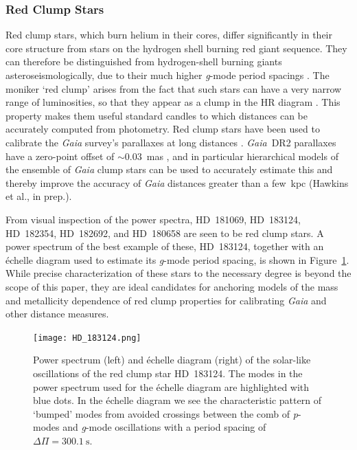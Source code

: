 \documentclass[a4paper,fleqn,usenatbib]{mnras}
\newcommand{\gaia}{\emph{Gaia}\xspace}
\begin{document}
\subsubsection{Red Clump Stars}
\label{clumpstars}

Red clump stars, which burn helium in their cores, differ significantly in their core structure from stars on the hydrogen shell burning red giant sequence. They can therefore be distinguished from hydrogen-shell burning giants asteroseismologically, due to their much higher \emph{g}-mode period spacings \citep{rggmodehelium}. 
The moniker `red clump' arises from the fact that such stars can have a very narrow range of luminosities, so that they appear as a clump in the HR diagram \citep{2016ARA&A..54...95G}. This property makes them useful standard candles to which distances can be accurately computed from photometry. Red clump stars have been used to calibrate the \gaia survey's parallaxes at long distances \citep{2017A&A...598L...4D,2017MNRAS.471..722H,2018A&A...609A.116R}. \gaia~DR2 parallaxes have a zero-point offset of $\sim 0.03$~mas \citep{gaiadr2parallax}, and in particular hierarchical models of the ensemble of \gaia clump stars can be used to accurately estimate this and thereby improve the accuracy of \gaia distances greater than a few~kpc (Hawkins et al., in prep.).

From visual inspection of the power spectra, HD~181069, HD~183124, HD~182354, HD~182692, and HD~180658 are seen to be red clump stars. A power spectrum of the best example of these, HD~183124, together with an \'{e}chelle diagram used to estimate its \emph{g}-mode period spacing, is shown in Figure~\ref{HD_183124}. While precise characterization of these stars to the necessary degree is beyond the scope of this paper, they are ideal candidates for anchoring models of the mass and metallicity dependence of red clump properties for calibrating \gaia and other distance measures. 

\begin{figure}
\noindent\texttt{[image: HD\_183124.png]}

\caption{\label{HD_183124}
Power spectrum (left) and \'{e}chelle diagram (right) of the solar-like oscillations of the red clump star HD~183124. The modes in the power spectrum used for the \'{e}chelle diagram are highlighted with blue dots. In the \'{e}chelle diagram we see the characteristic pattern of `bumped' modes from avoided crossings between the comb of \emph{p}-modes and \emph{g}-mode oscillations with a period spacing of $\Delta \Pi = 300.1~\text{s}$.}
\end{figure}
\end{document}
